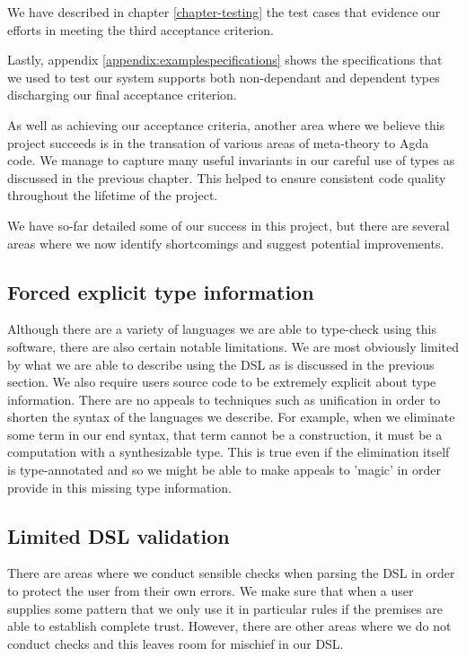 We have described in chapter \ref{chapter-testing} the test cases that
evidence our efforts in meeting the third acceptance criterion.

Lastly, appendix \ref{appendix:examplespecifications} shows the
specifications that we used to test our system supports both
non-dependant and dependent types discharging our final acceptance
criterion.

As well as achieving our acceptance criteria, another area where we
believe this project succeeds is in the transation of various areas of
meta-theory to Agda code. We manage to capture many useful invariants
in our careful use of types as discussed in the previous chapter. This
helped to ensure consistent code quality throughout the lifetime of
the project. 

We have so-far detailed some of our success in this project, but there
are several areas where we now identify shortcomings and suggest
potential improvements.

\subsection{Forced explicit type information}

Although there are a variety of languages we are able to type-check
using this software, there are also certain notable limitations. We
are most obviously limited by what we are able to describe using the
DSL as is discussed in the previous section. We also require users
source code to be extremely explicit about type information. There are
no appeals to techniques such as unification in order to shorten the
syntax of the languages we describe. For example, when we eliminate
some term in our end syntax, that term cannot be a construction, it
must be a computation with a synthesizable type. This is true even if
the elimination itself is type-annotated and so we might be able to
make appeals to 'magic' in order provide in this missing type
information.

\subsection{Limited DSL validation}

There are areas where we conduct sensible checks when parsing the DSL
in order to protect the user from their own errors. We make sure that
when a user supplies some pattern that we only use it in particular
rules if the premises are able to establish complete trust. However,
there are other areas where we do not conduct checks and this leaves
room for mischief in our DSL.

